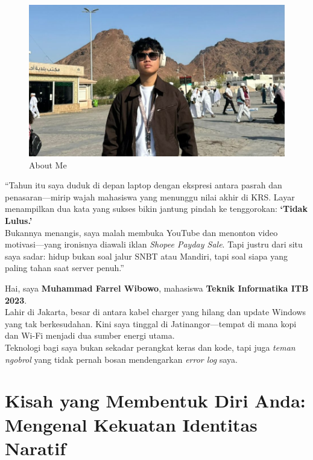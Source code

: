 \documentclass[
  letterpaper,
  DIV=11,
  numbers=noendperiod]{scrreprt}
\begin{document}
\begin{figure}[H]

{\centering \includegraphics[width=9.5\linewidth,height=\textheight,keepaspectratio]{All_About_me/../images/profile-pict.jpeg}

}

\caption{About Me}

\end{figure}%

``Tahun itu saya duduk di depan laptop dengan ekspresi antara pasrah dan
penasaran---mirip wajah mahasiswa yang menunggu nilai akhir di KRS.
Layar menampilkan dua kata yang sukses bikin jantung pindah ke
tenggorokan: \textbf{`Tidak Lulus.'}\\
Bukannya menangis, saya malah membuka YouTube dan menonton video
motivasi---yang ironisnya diawali iklan \emph{Shopee Payday Sale}. Tapi
justru dari situ saya sadar: hidup bukan soal jalur SNBT atau Mandiri,
tapi soal siapa yang paling tahan saat server penuh.''

Hai, saya \textbf{Muhammad Farrel Wibowo}, mahasiswa \textbf{Teknik
Informatika ITB 2023}.\\
Lahir di Jakarta, besar di antara kabel charger yang hilang dan update
Windows yang tak berkesudahan. Kini saya tinggal di Jatinangor---tempat
di mana kopi dan Wi-Fi menjadi dua sumber energi utama.\\
Teknologi bagi saya bukan sekadar perangkat keras dan kode, tapi juga
\emph{teman ngobrol} yang tidak pernah bosan mendengarkan \emph{error
log} saya.

\section{\texorpdfstring{\textbf{Kisah yang Membentuk Diri Anda:
Mengenal Kekuatan Identitas
Naratif}}{Kisah yang Membentuk Diri Anda: Mengenal Kekuatan Identitas Naratif}}\label{kisah-yang-membentuk-diri-anda-mengenal-kekuatan-identitas-naratif}
\end{document}
